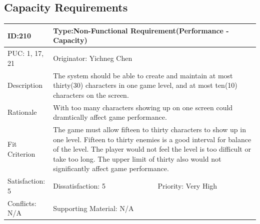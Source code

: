 \documentclass{article}
\begin{document}
	\subsection{Capacity Requirements}
	\begin{table}[H]
		\begin{tabular}{|l|l|l|}
			\hline
			ID:210 & \multicolumn{2}{l|}{Type:Non-Functional Requirement(Performance - Capacity)} \\ \hline
			PUC: 1, 17, 21 & \multicolumn{2}{l|}{Originator: Yichneg Chen} \\ \hline
			Description & \multicolumn{2}{m{0.85\textwidth}|}{The system should be able to create and maintain at most thirty(30) characters in one game level, and at most ten(10) characters on the screen.} \\ \hline
			Rationale & \multicolumn{2}{m{0.85\textwidth}|}{With too many characters showing up on one screen could dramtically affect game performance.} \\ \hline
			Fit Criterion & \multicolumn{2}{m{0.85\textwidth}|}{The game must allow fifteen to thirty characters to show up in one level. Fifteen to thirty enemies is a good interval for balance of the level. The player would not feel the level is too difficult or take too long. The upper limit of thirty also would not significantly affect game performance.} \\ \hline
			Satisfaction: 5 & Dissatisfaction: 5 & Priority: Very High \\ \hline
			Conflicts: N/A & \multicolumn{2}{l|}{Supporting Material: N/A} \\ \hline
		\end{tabular}
	\end{table}
\end{document}
